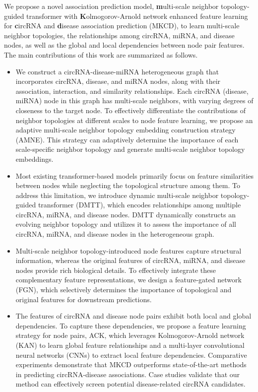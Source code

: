 \documentclass[journal,twoside,web]{ieeecolor}
\begin{document}
We propose a novel association prediction model, \textbf{m}ulti-scale neighbor topology-guided transformer with \textbf{K}olmogorov-Arnold network enhanced feature learning for \textbf{c}ircRNA and \textbf{d}isease association prediction (MKCD), to learn multi-scale neighbor topologies, the relationships among circRNA, miRNA, and disease nodes, as well as the global and local dependencies between node pair features. The main contributions of this work are summarized as follows.

\begin{itemize}
   	\item We construct a circRNA-disease-miRNA heterogeneous graph that incorporates circRNA, disease, and miRNA nodes, along with their association, interaction, and similarity relationships. Each circRNA (disease, miRNA) node in this graph has multi-scale neighbors, with varying degrees of closeness to the target node. To effectively differentiate the contributions of neighbor topologies at different scales to node feature learning, we propose an adaptive multi-scale neighbor topology embedding construction strategy (AMNE). This strategy can adaptively determine the importance of each scale-specific neighbor topology and generate multi-scale neighbor topology embeddings.
    \item Most existing transformer-based models primarily focus on feature similarities between nodes while neglecting the topological structure among them. To address this limitation, we introduce dynamic multi-scale neighbor topology-guided transformer (DMTT), which encodes relationships among multiple circRNA, miRNA, and disease nodes. DMTT dynamically constructs an evolving neighbor topology and utilizes it to assess the importance of all circRNA, miRNA, and disease nodes in the heterogeneous graph.
	\item Multi-scale neighbor topology-introduced node features capture structural information, whereas the original features of circRNA, miRNA, and disease nodes provide rich biological details. To effectively integrate these complementary feature representations, we design a feature-gated network (FGN), which selectively determines the importance of topological and original features for downstream predictions.
	\item The features of circRNA and disease node pairs exhibit both local and global dependencies. To capture these dependencies, we propose a feature learning strategy for node pairs, ACK, which leverages Kolmogorov-Arnold network (KAN)\cite{liu2024kan} to learn global feature relationships and a multi-layer convolutional neural networks (CNNs) to extract local feature dependencies. Comparative experiments demonstrate that MKCD outperforms state-of-the-art methods in predicting circRNA-disease associations. Case studies validate that our method can effectively screen potential disease-related circRNA candidates.
\end{itemize}
\end{document}

